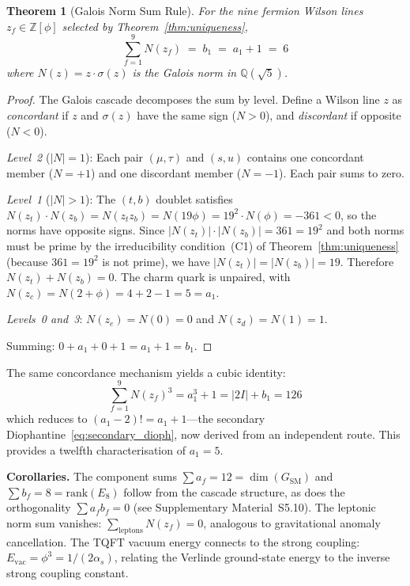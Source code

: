 \documentclass[12pt,a4paper]{article}
\newtheorem{theorem}{Theorem}
\theoremstyle{definition}
\begin{document}
\begin{theorem}[Galois Norm Sum Rule]\label{thm:norm_sum}
For the nine fermion Wilson lines $z_f \in \mathbb{Z}[\phi]$ selected by Theorem~\ref{thm:uniqueness},
\begin{equation}
\boxed{\sum_{f=1}^{9} N(z_f) \;=\; b_1 \;=\; a_1 + 1 \;=\; 6}
\label{eq:norm_sum}
\end{equation}
where $N(z) = z \cdot \sigma(z)$ is the Galois norm in $\mathbb{Q}(\sqrt{5})$.
\end{theorem}

\begin{proof}
The Galois cascade decomposes the sum by level.  Define a Wilson line $z$ as \emph{concordant} if $z$ and $\sigma(z)$ have the same sign ($N > 0$), and \emph{discordant} if opposite ($N < 0$).

\emph{Level~2} ($|N| = 1$): Each pair $(\mu, \tau)$ and $(s, u)$ contains one concordant member ($N = +1$) and one discordant member ($N = -1$).  Each pair sums to zero.

\emph{Level~1} ($|N| > 1$): The $(t, b)$ doublet satisfies $N(z_t) \cdot N(z_b) = N(z_t z_b) = N(19\phi) = 19^2 \cdot N(\phi) = -361 < 0$, so the norms have opposite signs.  Since $|N(z_t)| \cdot |N(z_b)| = 361 = 19^2$ and both norms must be prime by the irreducibility condition~(C1) of Theorem~\ref{thm:uniqueness} (because $361 = 19^2$ is not prime), we have $|N(z_t)| = |N(z_b)| = 19$.  Therefore $N(z_t) + N(z_b) = 0$.  The charm quark is unpaired, with $N(z_c) = N(2 + \phi) = 4 + 2 - 1 = 5 = a_1$.

\emph{Levels~0 and~3}: $N(z_e) = N(0) = 0$ and $N(z_d) = N(1) = 1$.

Summing: $0 + a_1 + 0 + 1 = a_1 + 1 = b_1$.
\end{proof}

\noindent The same concordance mechanism yields a cubic identity:
\begin{equation}
\sum_{f=1}^{9} N(z_f)^3 = a_1^3 + 1 = |2I| + b_1 = 126
\label{eq:cubic_norm}
\end{equation}
which reduces to $(a_1 - 2)! = a_1 + 1$---the secondary Diophantine~\eqref{eq:secondary_dioph}, now derived from an independent route.  This provides a twelfth characterisation of $a_1 = 5$.

\noindent\textbf{Corollaries.}  The component sums $\sum a_f = 12 = \dim(G_{\text{SM}})$ and $\sum b_f = 8 = \mathrm{rank}(E_8)$ follow from the cascade structure, as does the orthogonality $\sum a_f b_f = 0$ (see Supplementary Material~S5.10).  The leptonic norm sum vanishes: $\sum_{\text{leptons}} N(z_f) = 0$, analogous to gravitational anomaly cancellation.  The TQFT vacuum energy connects to the strong coupling: $E_{\text{vac}} = \phi^3 = 1/(2\alpha_s)$, relating the Verlinde ground-state energy to the inverse strong coupling constant.
\end{document}
